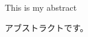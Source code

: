 \begin{eabstract}
  This is my abstract
\end{eabstract}


\begin{jabstract}
  アブストラクトです。
\end{jabstract}
